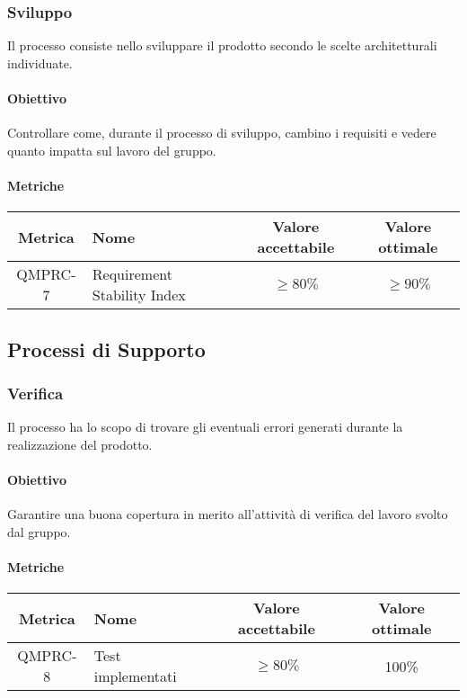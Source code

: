 \subsubsection{Sviluppo}
Il processo consiste nello sviluppare il prodotto secondo le scelte architetturali individuate.

\paragraph{Obiettivo}
Controllare come, durante il processo di sviluppo, cambino i requisiti e vedere quanto
impatta sul lavoro del gruppo.

\paragraph{Metriche}
\begin{center}
    \renewcommand{\arraystretch}{1.8}
    \begin{tabular}{ |c|m{12em}|c|c|}
        \hline
        \textbf{Metrica} & \textbf{Nome} & \textbf{Valore accettabile} & \textbf{Valore ottimale} \\
        \hline
        QMPRC-7 & Requirement Stability \newline Index & $ \geq 80\% $ & $ \geq 90\% $ \\
        \hline
    \end{tabular}
\end{center}

\subsection{Processi di Supporto}
\subsubsection{Verifica}
Il processo ha lo scopo di trovare gli eventuali errori generati durante la realizzazione del prodotto.

\paragraph{Obiettivo}
Garantire una buona copertura in merito all'attività di verifica del lavoro svolto dal gruppo.

\paragraph{Metriche}
\begin{center}
    \renewcommand{\arraystretch}{1.8}
    \begin{tabular}{ |c|m{12em}|c|c|}
        \hline
        \textbf{Metrica} & \textbf{Nome} & \textbf{Valore accettabile} & \textbf{Valore ottimale} \\
        \hline
        QMPRC-8 & Test implementati & $ \geq 80\% $ & 100\% \\
        \hline
    \end{tabular}
\end{center}

